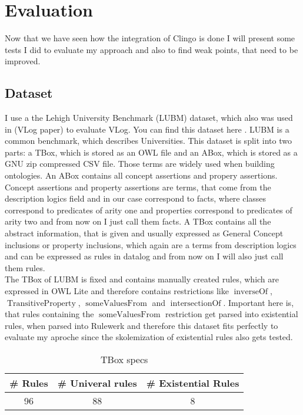 \documentclass[hyperref, bachelorofscience]{cgvpub}
\begin{document}
 
\chapter{Evaluation}
Now that we have seen how the integration of Clingo is done I will present some tests I did to evaluate my approach and also to find weak points, that need to be improved.
\section{Dataset} 
I use a the Lehigh University Benchmark (LUBM) \cite{article} dataset, which also was used in (VLog paper) to evaluate VLog. You can find this dataset here \cite{B2020}. LUBM is a common benchmark, which describes Universities. This dataset is split into two parts: a TBox, which is stored as an OWL file and an ABox, which is stored as a GNU zip compressed CSV file. Those terms are widely used when building ontologies. An ABox contains all concept assertions and propery assertions. Concept assertions and property assertions are terms, that come from the description logics field and in our case correspond to facts, where classes correspond to predicates of arity one and properties correspond to predicates of arity two and from now on I just call them facts. A TBox contains all the abstract information, that is given and usually expressed as General Concept inclusions or property inclusions, which again are a terms from description logics and can be expressed as rules in datalog and from now on I will also just call them rules.\\
The TBox of LUBM is fixed and contains manually created rules, which are expressed in OWL Lite and therefore contains restrictions like $\operatorname{inverseOf}$, $\operatorname{TransitiveProperty}$, $\operatorname{someValuesFrom}$ and $\operatorname{intersectionOf}$.
Important here is, that rules containing the $\operatorname{someValuesFrom}$ restriction get parsed into existential rules, when parsed into Rulewerk and therefore this dataset fits perfectly to evaluate my aproche since the skolemization of existential rules also gets tested. 

\begin{table}
\centering
\begin{tabular}{|c|c|c|}
\hline
\# Rules & \# Univeral rules & \# Existential Rules \\
\hline
\hline
96 & 88 & 8 \\
\hline
\end{tabular}
\caption{TBox specs}
\end{table}
\end{document}
